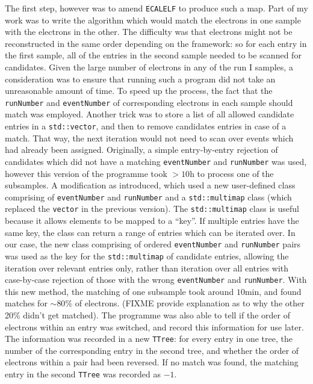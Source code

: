 \documentclass[10pt]{article}
\begin{document}
The first step, however was to amend \texttt{ECALELF} to produce such a map. Part of my work was to write the algorithm which would match the electrons in one sample with the electrons in the other. The difficulty was that electrons might not be reconstructed in the same order depending on the framework: so for each entry in the first sample, all of the entries in the second sample needed to be scanned for candidates. Given the large number of electrons in any of the run I samples, a consideration was to ensure that running such a program did not take an unreasonable amount of time. To speed up the process, the fact that the \texttt{runNumber} and \texttt{eventNumber} of corresponding electrons in each sample should match was employed. Another trick was to store a list of all allowed candidate entries in a \texttt{std::vector}, and then to remove candidates entries in case of a match. That way, the next iteration would not need to scan over events which had already been assigned. Originally, a simple entry-by-entry rejection of candidates which did not have a matching \texttt{eventNumber} and \texttt{runNumber} was used, however this version of the programme took $>10$h to process one of the subsamples. A modification as introduced, which used a new user-defined class comprising of \texttt{eventNumber} and \texttt{runNumber} and a \texttt{std::multimap} class (which replaced the \texttt{vector} in the previous version). The \texttt{std::multimap} class is useful because it allows elements to be mapped to a ``key''. If multiple entries have the same key, the class can return a range of entries which can be iterated over. In our case, the new class comprising of ordered \texttt{eventNumber} and \texttt{runNumber} pairs was used as the key for the  \texttt{std::multimap} of candidate entries, allowing the iteration over relevant entries only, rather than iteration over all entries with case-by-case rejection of those with the wrong \texttt{eventNumber} and \texttt{runNumber}. With this new method, the matching of one subsample took around $10$min, and found matches for $\sim 80\%$ of electrons. (FIXME provide explanation as to why the other 20\% didn't get matched). The programme was also able to tell if the order of electrons within an entry was switched, and record this information for use later. The information was recorded in a new \texttt{TTree}: for every entry in one tree, the number of the corresponding entry in the second tree, and whether the order of electrons within a pair had been reversed. If no match was found, the matching entry in the second \texttt{TTree} was recorded as $-1$.
\end{document}
